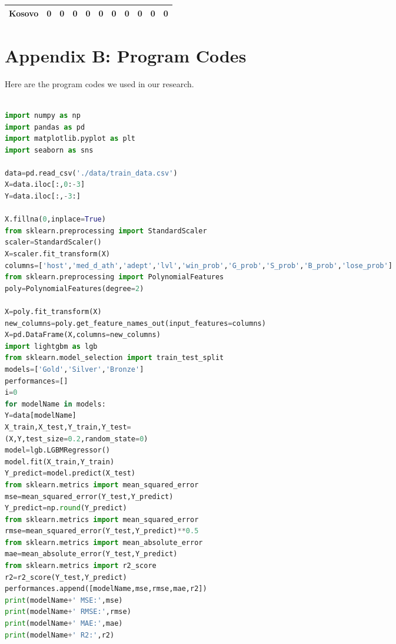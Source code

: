 \documentclass[12pt]{article}  %
\begin{document}
\begin{subappendices}
\begin{longtable}{|l|c|c|c|c|c|c|c|c|c|c|}
	\hline
	Kosovo                                                         & 0                                                                      & 0                                                                      & 0                                                                      & 0                                                                      & 0                                                                      & 0                                                                      & 0                         & 0                           & 0                           & 0                           \\
	\hline
\end{longtable}


\clearpage
\section{Appendix B: Program Codes}
Here are the program codes we used in our research.




\begin{lstlisting}[language=Python, name={LightGBM.py}]

import numpy as np
import pandas as pd
import matplotlib.pyplot as plt
import seaborn as sns

data=pd.read_csv('./data/train_data.csv')
X=data.iloc[:,0:-3]
Y=data.iloc[:,-3:]

X.fillna(0,inplace=True)
from sklearn.preprocessing import StandardScaler
scaler=StandardScaler()
X=scaler.fit_transform(X)
columns=['host','med_d_ath','adept','lvl','win_prob','G_prob','S_prob','B_prob','lose_prob']
from sklearn.preprocessing import PolynomialFeatures
poly=PolynomialFeatures(degree=2)

X=poly.fit_transform(X)
new_columns=poly.get_feature_names_out(input_features=columns)
X=pd.DataFrame(X,columns=new_columns)
import lightgbm as lgb
from sklearn.model_selection import train_test_split
models=['Gold','Silver','Bronze']
performances=[]
i=0
for modelName in models:
Y=data[modelName]
X_train,X_test,Y_train,Y_test=
(X,Y,test_size=0.2,random_state=0)
model=lgb.LGBMRegressor()
model.fit(X_train,Y_train)
Y_predict=model.predict(X_test)
from sklearn.metrics import mean_squared_error
mse=mean_squared_error(Y_test,Y_predict)
Y_predict=np.round(Y_predict)
from sklearn.metrics import mean_squared_error
rmse=mean_squared_error(Y_test,Y_predict)**0.5
from sklearn.metrics import mean_absolute_error
mae=mean_absolute_error(Y_test,Y_predict)
from sklearn.metrics import r2_score
r2=r2_score(Y_test,Y_predict)
performances.append([modelName,mse,rmse,mae,r2])
print(modelName+' MSE:',mse)
print(modelName+' RMSE:',rmse)
print(modelName+' MAE:',mae)
print(modelName+' R2:',r2)


\end{lstlisting}
\end{subappendices}
\end{document}
